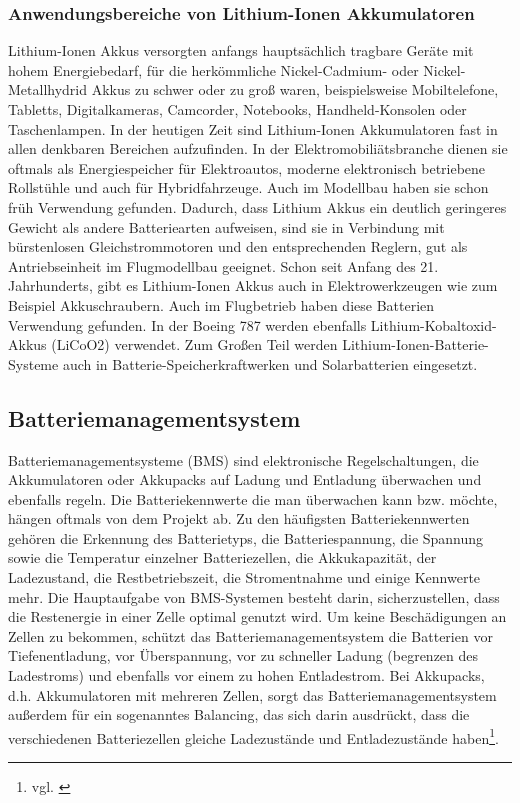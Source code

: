 \subsubsection{Anwendungsbereiche von Lithium-Ionen Akkumulatoren}
Lithium-Ionen Akkus versorgten anfangs hauptsächlich tragbare Geräte mit hohem Energiebedarf, für die herkömmliche Nickel-Cadmium- oder Nickel-Metallhydrid Akkus zu schwer oder zu groß waren, beispielsweise Mobiltelefone, Tabletts, Digitalkameras, Camcorder, Notebooks, Handheld-Konsolen oder Taschenlampen. In der heutigen Zeit sind Lithium-Ionen Akkumulatoren fast in allen denkbaren Bereichen aufzufinden. In der Elektromobiliätsbranche dienen sie oftmals als Energiespeicher für Elektroautos, moderne elektronisch betriebene Rollstühle und auch für Hybridfahrzeuge. Auch im Modellbau haben sie schon früh Verwendung gefunden. Dadurch, dass Lithium Akkus ein deutlich geringeres Gewicht als andere Batteriearten aufweisen, sind sie in Verbindung mit bürstenlosen Gleichstrommotoren und den entsprechenden Reglern, gut als Antriebseinheit im Flugmodellbau geeignet. Schon seit Anfang des 21. Jahrhunderts, gibt es Lithium-Ionen Akkus auch in Elektrowerkzeugen wie zum Beispiel Akkuschraubern. Auch im Flugbetrieb haben diese Batterien Verwendung gefunden. In der Boeing 787 werden ebenfalls Lithium-Kobaltoxid-Akkus (LiCoO2) verwendet. Zum Großen Teil werden Lithium-Ionen-Batterie-Systeme auch in Batterie-Speicherkraftwerken und Solarbatterien eingesetzt.
\newpage


\subsection{Batteriemanagementsystem}
\label{Batteriemanagementsystem}
Batteriemanagementsysteme (BMS) sind elektronische Regelschaltungen, die Akkumulatoren oder Akkupacks auf Ladung und Entladung überwachen und ebenfalls regeln. Die Batteriekennwerte die man überwachen kann bzw. möchte, hängen oftmals von dem Projekt ab. Zu den häufigsten Batteriekennwerten gehören die Erkennung des Batterietyps, die Batteriespannung, die Spannung sowie die Temperatur einzelner Batteriezellen, die Akkukapazität, der Ladezustand, die Restbetriebszeit, die Stromentnahme und einige Kennwerte mehr. Die Hauptaufgabe von BMS-Systemen besteht darin, sicherzustellen, dass die Restenergie in einer Zelle optimal genutzt wird. Um keine Beschädigungen an Zellen zu bekommen, schützt das Batteriemanagementsystem die Batterien vor Tiefenentladung, vor Überspannung, vor zu schneller Ladung (begrenzen des Ladestroms) und ebenfalls vor einem zu hohen Entladestrom. Bei Akkupacks, d.h. Akkumulatoren mit mehreren Zellen, sorgt das Batteriemanagementsystem außerdem für ein sogenanntes Balancing, das sich darin ausdrückt, dass die verschiedenen Batteriezellen gleiche Ladezustände und Entladezustände haben\footnote{vgl. \cite{Batteriemanagementsystem}}.

